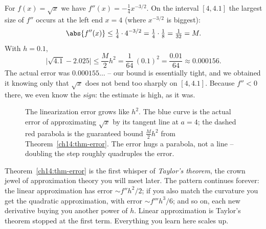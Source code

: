 \begin{example}
\label{ch14:ex-sqrt-bound}
For $f(x)=\sqrt{x}$ we have $f''(x) = -\tfrac14 x^{-3/2}$. On the interval
$[4,4.1]$ the largest size of $f''$ occurs at the left end $x=4$ (where
$x^{-3/2}$ is biggest):
\[
\abs{f''(x)} \le \tfrac14 \cdot 4^{-3/2} = \tfrac14\cdot \tfrac18 = \tfrac{1}{32}
= M.
\]
With $h = 0.1$,
\[
\big|\sqrt{4.1}-2.025\big| \le \frac{M}{2}h^2
= \frac{1}{64}\,(0.1)^2 = \frac{0.01}{64} \approx 0.000156.
\]
The actual error was $0.000155\ldots$ -- our bound is essentially tight, and we
obtained it knowing only that $\sqrt{x}$ does not bend too sharply on $[4,4.1]$.
Because $f''<0$ there, we even know the \emph{sign}: the estimate is high, as it
was.
\end{example}

\begin{figure}[H]
\centering
{}
\caption{The linearization error grows like $h^2$. The blue curve is the actual
error of approximating $\sqrt{x}$ by its tangent line at $a=4$; the dashed red
parabola is the guaranteed bound $\tfrac{M}{2}h^2$ from
Theorem~\ref{ch14:thm-error}. The error hugs a parabola, not a line -- doubling
the step roughly quadruples the error.}
\label{ch14:fig-errgrow}
\end{figure}

\begin{aestheticbox}
Theorem~\ref{ch14:thm-error} is the first whisper of \emph{Taylor's theorem}, the
crown jewel of approximation theory you will meet later. The pattern continues
forever: the linear approximation has error $\sim f'' h^2/2$; if you also match
the curvature you get the quadratic approximation, with error $\sim f''' h^3/6$;
and so on, each new derivative buying you another power of $h$. Linear
approximation is Taylor's theorem stopped at the first term. Everything you learn
here scales up.
\end{aestheticbox}

